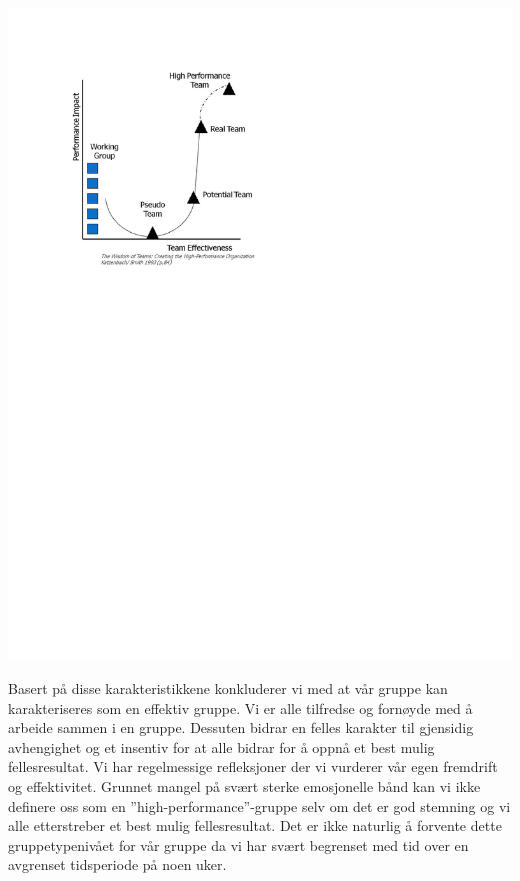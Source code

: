 \begin{enumerate}
\begin{center}
\includegraphics[clip=true, width=1 \textwidth,
trim=0cm 0cm 0cm 0cm]{Gruppetypene.pdf}
\label{fig:gruppetype}
\end{center}

\end{enumerate}

Basert på disse karakteristikkene konkluderer vi med at vår gruppe kan karakteriseres som en effektiv gruppe. Vi er alle tilfredse og fornøyde med å arbeide sammen i en gruppe. Dessuten bidrar en felles karakter til gjensidig avhengighet og et insentiv for at alle bidrar for å oppnå et best mulig fellesresultat. Vi har regelmessige refleksjoner der vi vurderer vår egen fremdrift og effektivitet. Grunnet mangel på svært sterke emosjonelle bånd kan vi ikke definere oss som en ''high-performance''-gruppe selv om det er god stemning og vi alle etterstreber et best mulig fellesresultat. Det er ikke naturlig å forvente dette gruppetypenivået for vår gruppe da vi har svært begrenset med tid over en avgrenset tidsperiode på noen uker.\\

